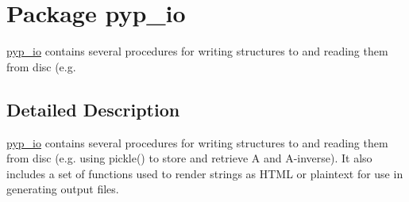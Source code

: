 \hypertarget{namespacepyp__io}{
\section{Package pyp\_\-io}
\label{namespacepyp__io}
}


\hyperlink{namespacepyp__io}{pyp\_\-io} contains several procedures for writing structures to and reading them from disc (e.g.  




\subsection{Detailed Description}
\hyperlink{namespacepyp__io}{pyp\_\-io} contains several procedures for writing structures to and reading them from disc (e.g. using pickle() to store and retrieve A and A-\/inverse). It also includes a set of functions used to render strings as HTML or plaintext for use in generating output files. 